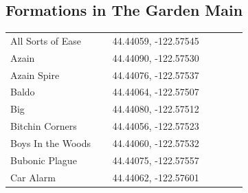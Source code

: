 \begin{flushleft}
\subsection{Formations in The Garden Main}
\begin{center}
\begin{supertabular}{p{0.38\linewidth}p{0.5\linewidth}}
All Sorts of Ease & 44.44059, -122.57545 \\
Azain & 44.44090, -122.57530 \\
Azain Spire & 44.44076, -122.57537 \\
Baldo & 44.44064, -122.57507 \\
Big & 44.44080, -122.57512 \\
Bitchin Corners & 44.44056, -122.57523 \\
Boys In the Woods & 44.44060, -122.57532 \\
Bubonic Plague & 44.44075, -122.57557 \\
Car Alarm & 44.44062, -122.57601 \\

\end{supertabular}
\end{center}
\end{flushleft}
